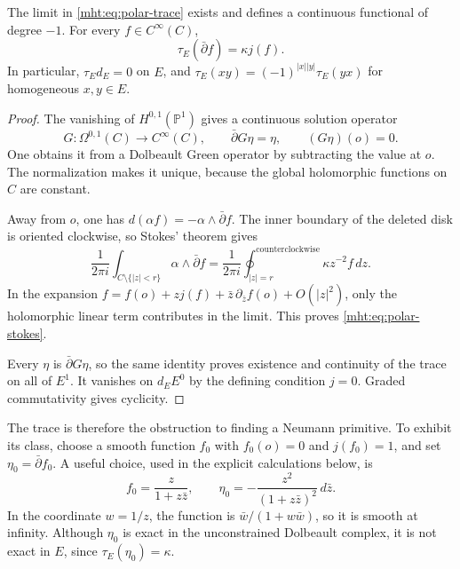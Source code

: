\begin{lemma}\label{mht:lem:polar-stokes}
The limit in \eqref{mht:eq:polar-trace} exists and defines a continuous
functional of degree $-1$. For every $f\in C^\infty(C)$,
\begin{equation}\label{mht:eq:polar-stokes}
 \tau_E(\bar\partial f)=\kappa j(f).
\end{equation}
In particular, $\tau_Ed_E=0$ on $E$, and
$\tau_E(xy)=(-1)^{|x||y|}\tau_E(yx)$ for homogeneous $x,y\in E$.
\end{lemma}

\begin{proof}
The vanishing of $H^{0,1}(\mathbb P^1)$ gives a continuous solution
operator
\begin{equation}\label{mht:eq:normalized-green}
 G:\Omega^{0,1}(C)\longrightarrow C^\infty(C),\qquad
 \bar\partial G\eta=\eta,\qquad (G\eta)(o)=0.
\end{equation}
One obtains it from a Dolbeault Green operator by subtracting the value
at $o$. The normalization makes it unique, because the global
holomorphic functions on $C$ are constant.

Away from $o$, one has $d(\alpha f)=-\alpha\wedge\bar\partial f$.
The inner boundary of the deleted disk is oriented clockwise, so
Stokes' theorem gives
\[
 \frac1{2\pi i}\int_{C\setminus\{|z|<r\}}\alpha\wedge\bar\partial f
 =\frac1{2\pi i}\oint_{|z|=r}^{\mathrm{counterclockwise}}
        \kappa z^{-2}f\,dz.
\]
In the expansion
$f=f(o)+zj(f)+\bar z\,\partial_{\bar z}f(o)+O(|z|^2)$,
only the holomorphic linear term contributes in the limit.
This proves \eqref{mht:eq:polar-stokes}.

Every $\eta$ is $\bar\partial G\eta$, so the same identity proves
existence and continuity of the
trace on all of $E^1$. It vanishes on $d_EE^0$ by the defining condition
$j=0$. Graded commutativity gives cyclicity.
\end{proof}

The trace is therefore the obstruction to finding a Neumann primitive.
To exhibit its class, choose a smooth function $f_0$ with
$f_0(o)=0$ and $j(f_0)=1$, and set $\eta_0=\bar\partial f_0$.
A useful choice, used in the explicit calculations below, is
\begin{equation}\label{mht:eq:sphere-representative}
 f_0=\frac{z}{1+z\bar z},\qquad
 \eta_0=-\frac{z^2}{(1+z\bar z)^2}\,d\bar z.
\end{equation}
In the coordinate $w=1/z$, the function is
$\bar w/(1+w\bar w)$, so it is smooth at infinity.
Although $\eta_0$ is exact in the unconstrained Dolbeault complex,
it is not exact in $E$, since $\tau_E(\eta_0)=\kappa$.

